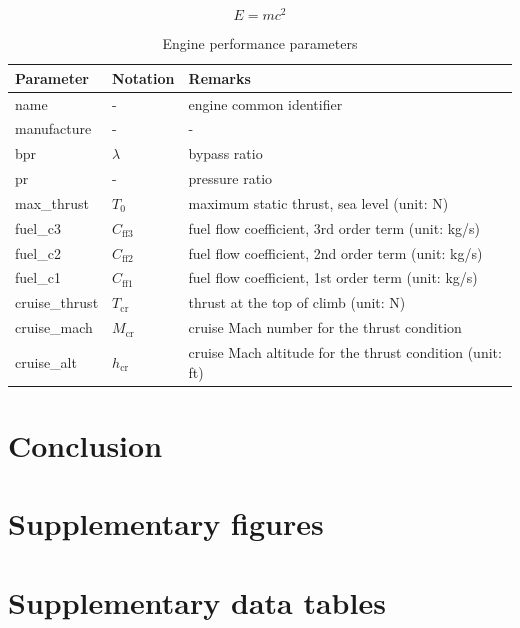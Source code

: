 \documentclass[
  manuscript=article,  %
  year=20xx,
  volume=x,
]{joas}
\begin{document}
\blindtext

\begin{equation}
  E = m c^2
\end{equation}

\blindtext

\begin{table}[H]
  \centering
  \small
  \caption{Engine performance parameters}
  \label{tb:eng_perf_params}
  \begin{tabular}{lll}
  \toprule
  \textbf{Parameter} & \textbf{Notation} & \textbf{Remarks} \\
  \midrule
  name & - & engine common identifier \\
  manufacture & - & -  \\
  bpr & $\lambda$ & bypass ratio \\
  pr & - & pressure ratio \\
  max\_thrust & $T_0$ & maximum static thrust, sea level (unit: N) \\
  fuel\_c3 & $C_\mathrm{ff3}$ & fuel flow coefficient, 3rd order term (unit: kg/s) \\
  fuel\_c2 & $C_\mathrm{ff2}$ & fuel flow coefficient, 2nd order term (unit: kg/s) \\
  fuel\_c1 & $C_\mathrm{ff1}$ & fuel flow coefficient, 1st order term (unit: kg/s) \\
  cruise\_thrust & $T_\mathrm{cr}$ & thrust at the top of climb (unit: N) \\
  cruise\_mach & $M_\mathrm{cr}$ & cruise Mach number for the thrust condition \\
  cruise\_alt & $h_\mathrm{cr}$ & cruise Mach altitude for the thrust condition (unit: ft) \\
  \bottomrule
  \end{tabular}
\end{table}

\blindtext

\section{Conclusion}

\Blindtext


\begin{acknowledgement}
\blindtext
\end{acknowledgement}


\printbibliography

\appendix

\section{Supplementary figures}
\blindtext

\section{Supplementary data tables}
\blindtext
\end{document}
